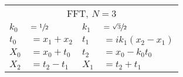 \begin{tabular}{|p{4.3pt}l|p{4.3pt}l|}\toprule \multicolumn{4}{|c|}{FFT, $N=3$} \\
$k_0 $ &$= \sfrac{1}{2}$ & $k_1 $ &$= \sfrac{\sqrt{3}}{2}$\\ 
$t_0 $ &$= x_1 + x_2$ & $t_1 $ &$= ik_1(x_2 - x_1)$\\ 
$X_0 $ &$= x_0 + t_0$ & $t_2 $ &$= x_0 - k_0t_0$\\ 
$X_2 $ &$= t_2 - t_1$ & $X_1 $ &$= t_2 + t_1$\\ 
\bottomrule\end{tabular}
